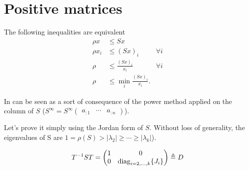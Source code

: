 \section{Positive matrices}
\begin{solution}
  The following inequalities are equivalent
  \begin{align*}
    \rho x & \leq Sx\\
    \rho x_i & \leq (Sx)_i & \forall i\\
    \rho & \leq \frac{(Sx)_i}{x_i} & \forall i\\
    \rho & \leq \min_i \frac{(Sx)_i}{x_i}.
  \end{align*}
\end{solution}

\begin{solution}
  In can be seen as a sort of consequence of the power method
  applied on the column of $S$
  ($S^\infty = S^\infty
  \begin{pmatrix}
    a_{:1} & \cdots & a_{:n}
  \end{pmatrix}$).

  Let's prove it simply using the Jordan form of $S$.
  Without loss of generality, the eigenvalues of S are $1 = \rho(S) > |\lambda_2| \geq \cdots \geq |\lambda_k|$).

  \begin{equation}
    T^{-1}ST =
    \begin{pmatrix}
      1 & 0\\
      0 &
      \operatorname{diag}_{i = 2, \ldots, k}
      \{J_i\}
    \end{pmatrix} \triangleq D \label{D}
  \end{equation}


\end{solution}
